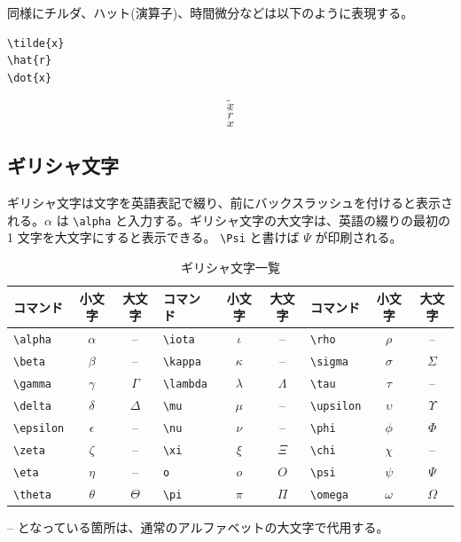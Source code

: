 同様にチルダ、ハット(演算子)、時間微分などは以下のように表現する。
\begin{reidai}
\begin{verbatim}
\tilde{x}
\hat{r}
\dot{x}
\end{verbatim}
\end{reidai}
\vspace*{-1.5em}
\begin{kekka}
  \begin{equation*}
    \tilde{x}
  \end{equation*}
  \begin{equation*}
    \hat{r}
  \end{equation*}
  \begin{equation*}
    \dot{x}
  \end{equation*}
  \vspace{0pt}
\end{kekka}

\subsection{ギリシャ文字}
\label{sec:latex:greek}

ギリシャ文字は文字を英語表記で綴り、前にバックスラッシュを付けると表示される。$\alpha$ は \verb|\alpha| と入力する。ギリシャ文字の大文字は、英語の綴りの最初の 1 文字を大文字にすると表示できる。 \verb|\Psi| と書けば $\Psi$ が印刷される。
\begin{table}[H]
  \begin{center}
    \caption{ギリシャ文字一覧}
    \label{tab:greek}
    \begin{tabular}{|lcc|lcc|lcc|}
      \hline
      コマンド & 小文字 & 大文字 & コマンド & 小文字 & 大文字 & コマンド & 小文字 & 大文字 \\
      \hline \hline
      \verb|\alpha| & $\alpha$ & -- & \verb|\iota| & $\iota$ & -- & \verb|\rho| & $\rho$ & -- \\
      \verb|\beta| & $\beta$ & -- & \verb|\kappa| & $\kappa$ & -- & \verb|\sigma| & $\sigma$ & $\Sigma$ \\
      \verb|\gamma| & $\gamma$ & $\Gamma$ & \verb|\lambda| & $\lambda$ & $\Lambda$ & \verb|\tau| & $\tau$ & -- \\
      \verb|\delta| & $\delta$ & $\Delta$ & \verb|\mu| & $\mu$ & -- & \verb|\upsilon| & $\upsilon$ & $\Upsilon$ \\
      \verb|\epsilon| & $\epsilon$ & -- & \verb|\nu| & $\nu$ & -- & \verb|\phi| & $\phi$ & $\Phi$ \\
      \verb|\zeta| & $\zeta$ & -- & \verb|\xi| & $\xi$ & $\Xi$ & \verb|\chi| & $\chi$ & -- \\
      \verb|\eta| & $\eta$ & -- & \verb|o| & $o$ & $O$ & \verb|\psi| & $\psi$ & $\Psi$ \\
      \verb|\theta| & $\theta$ & $\Theta$ & \verb|\pi| & $\pi$ & $\Pi$ & \verb|\omega| & $\omega$ & $\Omega$ \\
      \hline
    \end{tabular}
  \end{center}
\end{table} \noindent
-- となっている箇所は、通常のアルファベットの大文字で代用する。

